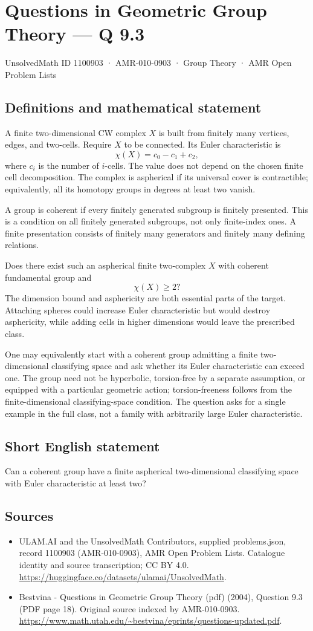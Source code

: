\documentclass[11pt,a4paper]{article}
\begin{document}
\section*{Questions in Geometric Group Theory — Q 9.3}\label{1100903}
{\small UnsolvedMath ID 1100903 · AMR-010-0903 · Group Theory · AMR Open Problem Lists}
\subsection{Definitions and mathematical statement}
A finite two-dimensional CW complex $X$ is built from finitely many vertices, edges, and two-cells. Require $X$ to be connected. Its Euler characteristic is
\[
 \chi(X)=c_0-c_1+c_2,
\]
where $c_i$ is the number of $i$-cells. The value does not depend on the chosen finite cell decomposition. The complex is aspherical if its universal cover is contractible; equivalently, all its homotopy groups in degrees at least two vanish.

A group is coherent if every finitely generated subgroup is finitely presented. This is a condition on all finitely generated subgroups, not only finite-index ones. A finite presentation consists of finitely many generators and finitely many defining relations.

Does there exist such an aspherical finite two-complex $X$ with coherent fundamental group and
\[
 \chi(X)\geq2?
\]
The dimension bound and asphericity are both essential parts of the target. Attaching spheres could increase Euler characteristic but would destroy asphericity, while adding cells in higher dimensions would leave the prescribed class.

One may equivalently start with a coherent group admitting a finite two-dimensional classifying space and ask whether its Euler characteristic can exceed one. The group need not be hyperbolic, torsion-free by a separate assumption, or equipped with a particular geometric action; torsion-freeness follows from the finite-dimensional classifying-space condition. The question asks for a single example in the full class, not a family with arbitrarily large Euler characteristic.
\subsection{Short English statement}
Can a coherent group have a finite aspherical two-dimensional classifying space with Euler characteristic at least two?
\subsection{Sources}
\begin{itemize}
\item[S1] ULAM.AI and the UnsolvedMath Contributors, supplied problems.json, record 1100903 (AMR-010-0903), AMR Open Problem Lists. Catalogue identity and source transcription; CC BY 4.0.
\url{https://huggingface.co/datasets/ulamai/UnsolvedMath}.
\item[S2] Bestvina - Questions in Geometric Group Theory (pdf) (2004), Question 9.3 (PDF page 18). Original source indexed by AMR-010-0903.
\url{https://www.math.utah.edu/~bestvina/eprints/questions-updated.pdf}.
\end{itemize}
\end{document}
